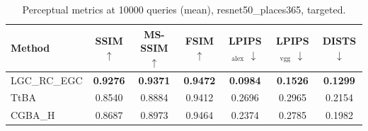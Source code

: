\begin{table}[t]
\centering\footnotesize
\caption{Perceptual metrics at 10000 queries (mean), resnet50\_places365, targeted.}
\begin{tabular}{lcccccc}
\toprule
Method & SSIM $\uparrow$ & MS-SSIM $\uparrow$ & FSIM $\uparrow$ & LPIPS$_{\mathrm{alex}}$ $\downarrow$ & LPIPS$_{\mathrm{vgg}}$ $\downarrow$ & DISTS $\downarrow$ \\
\midrule
LGC\_RC\_EGC & \textbf{0.9276} & \textbf{0.9371} & \textbf{0.9472} & \textbf{0.0984} & \textbf{0.1526} & \textbf{0.1299} \\
TtBA & 0.8540 & 0.8884 & 0.9412 & 0.2696 & 0.2965 & 0.2154 \\
CGBA\_H & 0.8687 & 0.8973 & 0.9464 & 0.2374 & 0.2785 & 0.1982 \\
\bottomrule
\end{tabular}
\end{table}
